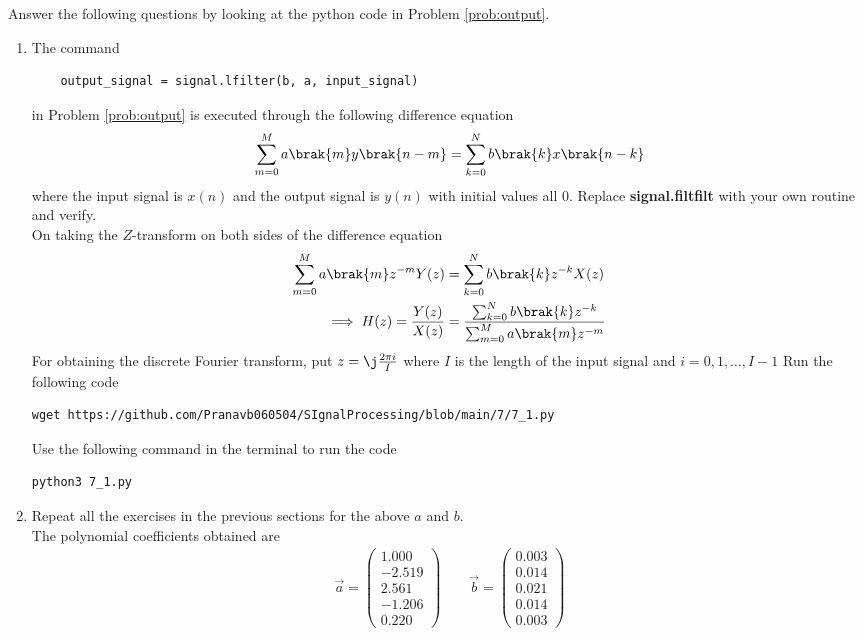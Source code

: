 \documentclass[journal,12pt,twocolumn]{IEEEtran}
\newcommand{\myvec}[1]{\ensuremath{\begin{pmatrix}#1\end{pmatrix}}}
\renewcommand\thesection{\arabic{section}}
\begin{document}
Answer the following questions by looking at the python code in Problem \ref{prob:output}.
\begin{enumerate}[label=\thesection.\arabic*]
\item
The command
\begin{lstlisting}
	output_signal = signal.lfilter(b, a, input_signal)
	\end{lstlisting}
in Problem \ref{prob:output} is executed through the following difference equation
\begin{equation}
\label{eq:iir_filter_gen}
 \sum _{m=0}^{M}a\brak{m}y\brak{n-m}=\sum _{k=0}^{N}b\brak{k}x\brak{n-k}
\end{equation}
%
where the input signal is $x(n)$ and the output signal is $y(n)$ with initial values all 0. Replace
\textbf{signal.filtfilt} with your own routine and verify.\\
\solution
On taking the $Z$-transform on both sides of the difference equation
	\begin{align}
		\sum _{m=0}^{M}a\brak{m} z^{-m} Y(z) &= \sum _{k=0}^{N}b\brak{k} z^{-k} X(z) \\
		\implies H(z) = \frac{Y(z)}{X(z)} &= \frac{\sum _{k=0}^{N}b\brak{k} z^{-k}}{\sum _{m=0}^{M}a\brak{m} z^{-m	}}
	\end{align}
	For obtaining the discrete Fourier transform, put $z = \j \frac{2\pi i}{I}$ where $I$ is the length of the input signal and $i = 0, 1, \ldots, I-1$
Run the following code 
\begin{lstlisting}
wget https://github.com/Pranavb060504/SIgnalProcessing/blob/main/7/7_1.py
\end{lstlisting}
Use the following command in the terminal to run the code
\begin{lstlisting}
python3 7_1.py
\end{lstlisting}
%
\item Repeat all the exercises in the previous sections for the above $a$ and $b$.\\
\solution
The polynomial coefficients obtained are
	\begin{align}
		\vec{a} = \myvec{1.000 \\ -2.519 \\ 2.561 \\ -1.206 \\ 0.220} \qquad
		\vec{b} = \myvec{0.003 \\ 0.014 \\ 0.021 \\ 0.014 \\ 0.003}
	\end{align}
	

\end{enumerate}
\end{document}
